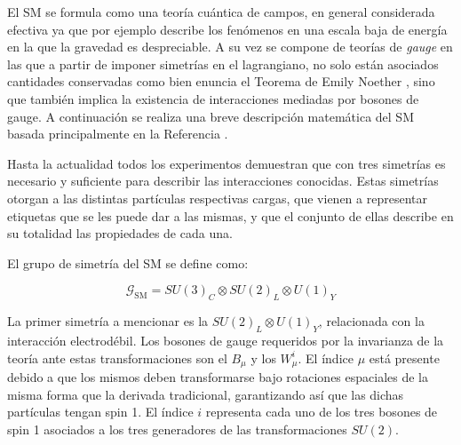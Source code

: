 El SM se formula como una teoría cuántica de campos, en general considerada efectiva ya que por ejemplo describe los fenómenos en una escala baja de energía en la que la gravedad es despreciable. A su vez se compone de teorías de \textit{gauge} en las que a partir de imponer simetrías en el lagrangiano, no solo están asociados cantidades conservadas como bien enuncia el Teorema de Emily Noether \cite{noether}, sino que también implica la existencia de interacciones mediadas por bosones de gauge. A continuación se realiza una breve descripción matemática del SM basada principalmente en la Referencia \cite{gkane}.

Hasta la actualidad todos los experimentos demuestran que con tres simetrías es necesario y suficiente para describir las interacciones conocidas. Estas simetrías otorgan a las distintas partículas respectivas cargas, que vienen a representar etiquetas que se les puede dar a las mismas, y que el conjunto de ellas describe en su totalidad las propiedades de cada una.

El grupo de simetría del SM se define como:

\begin{equation}
	\mathcal{G}_{\text{SM}} = SU(3)_C \otimes SU(2)_L \otimes U(1)_Y
\end{equation}

La primer simetría a mencionar es la $SU(2)_L \otimes U(1)_Y$, relacionada con la interacción electrodébil. Los bosones de gauge requeridos por la invarianza de la teoría ante estas transformaciones son el $B_{\mu}$ y los $W_{\mu}^{i}$. El índice $\mu$ está presente debido a que los mismos deben transformarse bajo rotaciones espaciales de la misma forma que la derivada tradicional, garantizando así que las dichas partículas tengan spin 1. El índice $i$ representa cada uno de los tres bosones de spin 1 asociados a los tres generadores de las transformaciones $SU(2)$.


